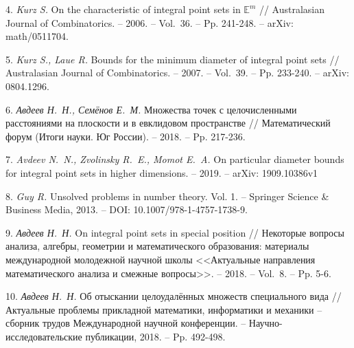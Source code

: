 \documentclass[12pt]{article}
\theoremstyle{theorem}
\theoremstyle{dfn}
\theoremstyle{remark}
\begin{document}
4.  \emph{ Kurz S.} On the characteristic of integral point sets in $\mathbb{E}^m$ // Australasian Journal of Combinatorics. -- 2006. -- Vol.~36. -- Pp. 241-248. --
arXiv: math/0511704.

5.  \emph{ Kurz S., Laue R.} Bounds for the minimum diameter of integral point sets
// Australasian Journal of Combinatorics. -- 2007. -- Vol.~39. -- Pp. 233-240. --
arXiv: 0804.1296.

6.  \emph{ Авдеев Н.~Н., Семёнов Е.~М.} Множества точек с целочисленными расстояниями на плоскости и в евклидовом пространстве // Математический форум 
(Итоги науки. Юг России). -- 2018. -- Pp. 217-236.

7.  \emph{ Avdeev N.~N., Zvolinsky R.~E., Momot E.~A.} On particular diameter bounds
for integral point sets in higher dimensions. -- 2019. -- arXiv: 1909.10386v1

8.  \emph{ Guy R.} Unsolved problems in number theory. Vol. 1. -- Springer Science \& Business Media, 2013. -- DOI: 10.1007/978-1-4757-1738-9.

9.  \emph{ Авдеев Н.~Н.} On integral point sets in special position // Некоторые вопросы анализа, алгебры, геометрии и математического образования: материалы международной молодежной научной школы <<Актуальные направления математического анализа и смежные вопросы>>. -- 2018. -- Vol.~8. -- Pp. 5-6.

10.  \emph{ Авдеев Н.~Н.} Об отыскании целоудалённых множеств специального вида
// Актуальные проблемы прикладной математики, информатики и механики -- 
сборник трудов Международной научной конференции. -- Научно-исследовательские публикации, 2018. -- Pp. 492-498.
\end{document}
